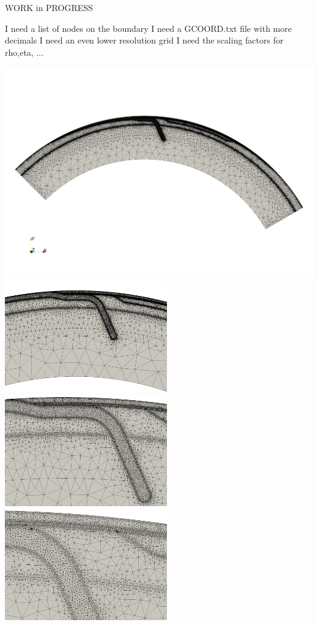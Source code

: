 
WORK in PROGRESS

I need a list of nodes on the boundary
I need a GCOORD.txt file with more decimals
I need an even lower resolution  grid
I need the scaling factors for rho,eta, ...


\includegraphics[width=14cm]{python_codes/fieldstone_44/grid_lowres1}\\
\includegraphics[width=7cm]{python_codes/fieldstone_44/grid_lowres2}
\includegraphics[width=7cm]{python_codes/fieldstone_44/grid_lowres3}\\
\includegraphics[width=7cm]{python_codes/fieldstone_44/grid_lowres4}

